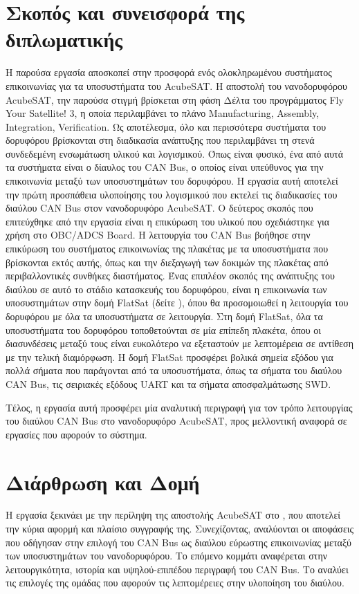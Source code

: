 \documentclass[a4paper,nobib,justified]{tufte-book}
\begin{document}
\section{Σκοπός και συνεισφορά της διπλωματικής}
Η παρούσα εργασία αποσκοπεί στην προσφορά ενός ολοκληρωμένου συστήματος επικοινωνίας για τα υποσυστήματα του AcubeSAT. Η αποστολή του νανοδορυφόρου AcubeSAT, την παρούσα στιγμή βρίσκεται στη φάση Δέλτα του προγράμματος Fly Your Satellite! 3, η οποία περιλαμβάνει το πλάνο Manufacturing, Assembly, Integration, Verification. Ως αποτέλεσμα, όλο και περισσότερα συστήματα του δορυφόρου βρίσκονται στη διαδικασία ανάπτυξης που περιλαμβάνει τη στενά συνδεδεμένη ενσωμάτωση υλικού και λογισμικού. Όπως είναι φυσικό, ένα από αυτά τα συστήματα είναι ο δίαυλος του CAN Bus, ο οποίος είναι υπεύθυνος για την επικοινωνία μεταξύ των υποσυστημάτων του δορυφόρου.  Η εργασία αυτή αποτελεί την πρώτη προσπάθεια υλοποίησης του λογισμικού που εκτελεί τις διαδικασίες του διαύλου CAN Bus στον νανοδορυφόρο AcubeSAT. Ο δεύτερος σκοπός που επιτεύχθηκε από την εργασία είναι η επικύρωση του υλικού που σχεδιάστηκε για χρήση στο OBC/ADCS Board. Η λειτουργία του CAN Bus βοήθησε στην επικύρωση του συστήματος επικοινωνίας της πλακέτας με τα υποσυστήματα που βρίσκονται εκτός αυτής, όπως και την διεξαγωγή των δοκιμών της πλακέτας από περιβαλλοντικές συνθήκες διαστήματος. Ένας επιπλέον σκοπός της ανάπτυξης του διαύλου σε αυτό το στάδιο κατασκευής του δορυφόρου, είναι η επικοινωνία των υποσυστημάτων στην δομή FlatSat (δείτε ), όπου θα προσομοιωθεί η λειτουργία του δορυφόρου με όλα τα υποσυστήματα σε λειτουργία. Στη δομή FlatSat, όλα τα υποσυστήματα του δορυφόρου τοποθετούνται σε μία επίπεδη πλακέτα, όπου οι διασυνδέσεις μεταξύ τους είναι ευκολότερο να εξεταστούν με λεπτομέρεια σε αντίθεση με την τελική διαμόρφωση. Η δομή FlatSat προσφέρει βολικά σημεία εξόδου για πολλά σήματα που παράγονται από τα υποσυστήματα, όπως τα σήματα του διαύλου CAN Bus, τις σειριακές εξόδους UART και τα σήματα αποσφαλμάτωσης SWD. 

Τέλος, η εργασία αυτή προσφέρει μία αναλυτική περιγραφή για τον τρόπο λειτουργίας του διαύλου CAN Bus στο νανοδορυφόρο AcubeSAT, προς μελλοντική αναφορά σε εργασίες που αφορούν το σύστημα.

\section{Διάρθρωση και Δομή}
Η εργασία ξεκινάει με την περίληψη της αποστολής AcubeSAT στο , που αποτελεί την κύρια αφορμή και πλαίσιο συγγραφής της. Συνεχίζοντας, αναλύονται οι αποφάσεις που οδήγησαν στην επιλογή του CAN Bus ως διαύλου εύρωστης επικοινωνίας μεταξύ των υποσυστημάτων του νανοδορυφόρου. Το επόμενο κομμάτι αναφέρεται στην λειτουργικότητα, ιστορία και υψηλού-επιπέδου περιγραφή του CAN Bus. Το  αναλύει τις επιλογές της ομάδας που αφορούν τις λεπτομέρειες στην υλοποίηση του διαύλου.
\end{document}

